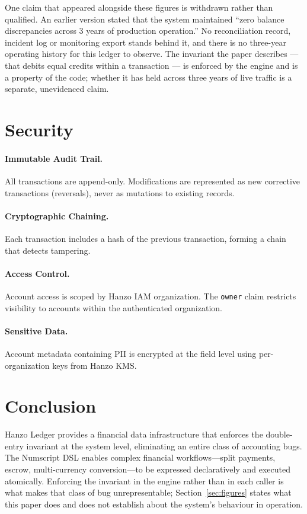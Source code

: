 \documentclass[11pt,twocolumn]{article}
\begin{document}
One claim that appeared alongside these figures is withdrawn rather than
qualified. An earlier version stated that the system maintained ``zero balance
discrepancies across 3 years of production operation.'' No reconciliation
record, incident log or monitoring export stands behind it, and there is no
three-year operating history for this ledger to observe. The invariant the
paper describes --- that debits equal credits within a transaction --- is
enforced by the engine and is a property of the code; whether it has held
across three years of live traffic is a separate, unevidenced claim.

\section{Security}

\paragraph{Immutable Audit Trail.} All transactions are append-only. Modifications are represented as new corrective transactions (reversals), never as mutations to existing records.

\paragraph{Cryptographic Chaining.} Each transaction includes a hash of the previous transaction, forming a chain that detects tampering.

\paragraph{Access Control.} Account access is scoped by Hanzo IAM organization. The \texttt{owner} claim restricts visibility to accounts within the authenticated organization.

\paragraph{Sensitive Data.} Account metadata containing PII is encrypted at the field level using per-organization keys from Hanzo KMS.

\section{Conclusion}

Hanzo Ledger provides a financial data infrastructure that enforces the double-entry invariant at the system level, eliminating an entire class of accounting bugs. The Numscript DSL enables complex financial workflows---split payments, escrow, multi-currency conversion---to be expressed declaratively and executed atomically. Enforcing the invariant in the engine rather than in each caller is what makes that class of bug unrepresentable; Section~\ref{sec:figures} states what this paper does and does not establish about the system's behaviour in operation.
\end{document}
